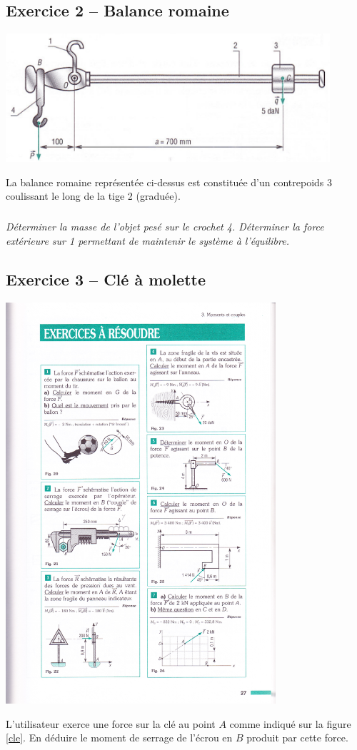 \documentclass[10pt]{article}
\begin{document}
\subsection*{Exercice 2 -- Balance romaine}
\begin{center}
\includegraphics[width=12cm]{images/balance.pdf}
\end{center}
La balance romaine représentée ci-dessus est constituée d'un contrepoids 3 coulissant le long de la tige 2 (graduée).
\subparagraph*{}
\textit{Déterminer la masse de l'objet pesé sur le crochet 4. Déterminer la force extérieure sur 1 permettant de maintenir le système à l'équilibre.}



\subsection*{Exercice 3 -- Clé à molette}
\begin{center}
\includegraphics[width=10cm]{images/moment7.pdf}
\end{center}
L'utilisateur exerce une force sur la clé au point $A$ comme indiqué sur la figure \ref{cle}. En déduire le moment de serrage de l'écrou en $B$ produit par cette force.
\end{document}
